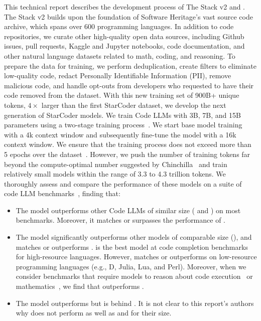 \documentclass[10pt]{article} %
\begin{document}
This technical report describes the development process of The Stack v2 and  \starcodertwo{}. The Stack v2 builds upon the foundation of Software Heritage's vast source code archive, which spans over 600 programming languages. In addition to code repositories, we curate other high-quality open data sources, including Github issues, pull requests, Kaggle and Jupyter notebooks, code documentation, and other natural language datasets related to math, coding, and reasoning. To prepare the data for training, we perform deduplication, create filters to eliminate low-quality code, redact Personally Identifiable Information (PII), remove malicious code, and handle opt-outs from developers who requested to have their code removed from the dataset. With this new training set of 900B+ unique tokens, $4\times$ larger than the first StarCoder dataset, we develop the next generation of StarCoder models. We train Code LLMs with 3B, 7B, and 15B parameters using a two-stage training process~\citep{roziere2023code,guo2024deepseek}. We start base model training with a 4k context window and subsequently fine-tune the model with a 16k context window. We ensure that the training process does not exceed more than 5 epochs over the dataset~\citep{muennighoff2024scaling}. However, we push the number of training tokens far beyond the compute-optimal number suggested by Chinchilla~\citep[Harm's law; ][]{harms_law} and train relatively small models within the range of 3.3 to 4.3 trillion tokens.  We thoroughly assess and compare the performance of these models on a suite of code LLM benchmarks~\citep{cassano:multipl-e,austin:mbpp,chen2021evaluating,liu2023is,pmlr-v202-lai23b,muennighoff2023octopack,cassano2023edit,liu2023repobench,ding2023crosscodeeval,gu2024cruxeval,cobbe2021gsm8k,pearce2022asleep,bold_2021,nozza-etal-2021-honest,toxicprompts}, finding that:
\begin{itemize}
\item The  model outperforms other Code LLMs of similar size ( and ) on most benchmarks. Moreover, it matches or surpasses the performance of .
\item The  model significantly outperforms other models of comparable size (), and matches or outperforms .  is the best model at code completion benchmarks for high-resource languages. However,  matches or outperforms  on low-resource programming languages (e.g., D, Julia, Lua, and Perl). 
Moreover, when we consider benchmarks that require models to reason about code execution~\citep{gu2024cruxeval} or mathematics~\citep{cobbe2021gsm8k}, we find that  outperforms .

\item The  model outperforms  but is behind . It is not clear to this report's authors why  does not perform as well as  and  for their size. 
\end{itemize}
\end{document}

